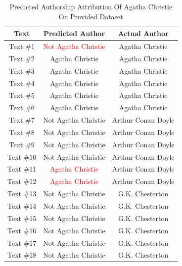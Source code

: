 \documentclass[journal]{IEEEtran} %
\begin{document}
\begin{table}
    \begin{center}
        \begin{tabular}{|c|c|c|}
            \hline
            \textbf{Text} & \textbf{Predicted Author}  & \textbf{Actual Author} \\
            \hline
            \hline
            Text \#1 & \textcolor{red}{Not Agatha Christie} & Agatha Christie \\
            \hline
            Text \#2 & Agatha Christie & Agatha Christie \\
            \hline
            Text \#3 & Agatha Christie & Agatha Christie \\
            \hline
            Text \#4 & Agatha Christie & Agatha Christie \\
            \hline
            Text \#5 & Agatha Christie & Agatha Christie \\
            \hline
            Text \#6 & Agatha Christie & Agatha Christie \\
            \hline
            Text \#7 & Not Agatha Christie & Arthur Conan Doyle \\
            \hline
            Text \#8 & Not Agatha Christie & Arthur Conan Doyle \\
            \hline
            Text \#9 & Not Agatha Christie & Arthur Conan Doyle \\
            \hline
            Text \#10 & Not Agatha Christie & Arthur Conan Doyle \\
            \hline
            Text \#11 & \textcolor{red}{Agatha Christie} & Arthur Conan Doyle \\
            \hline
            Text \#12 & \textcolor{red}{Agatha Christie} & Arthur Conan Doyle \\
            \hline
            Text \#13 & Not Agatha Christie & G.K. Chesterton \\
            \hline
            Text \#14 & Not Agatha Christie & G.K. Chesterton \\
            \hline
            Text \#15 & Not Agatha Christie & G.K. Chesterton \\
            \hline
            Text \#16 & Not Agatha Christie & G.K. Chesterton \\
            \hline
            Text \#17 & Not Agatha Christie & G.K. Chesterton \\
            \hline
            Text \#18 & Not Agatha Christie & G.K. Chesterton \\
            \hline
        \end{tabular}
        \label{tab2}
    \end{center}
    \caption{Predicted Authorship Attribution Of Agatha Christie On Provided Dataset}
\end{table}
\end{document}
